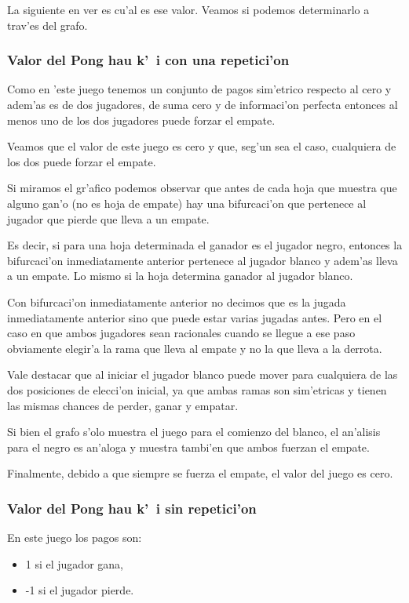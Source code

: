 La siguiente en ver es cu'al es ese valor. Veamos si podemos determinarlo a trav'es del grafo.

\subsubsection{Valor del Pong hau k'\ i con una repetici'on}

Como en 'este juego tenemos un conjunto de pagos sim'etrico respecto al cero y adem'as es de dos jugadores, de suma cero y de informaci'on perfecta entonces al menos uno de los dos jugadores puede forzar el empate.

Veamos que el valor de este juego es cero y que, seg'un sea el caso, cualquiera de los dos puede forzar el empate.

Si miramos el gr'afico podemos observar que antes de cada hoja que muestra que alguno gan'o (no es hoja de empate) hay una bifurcaci'on que pertenece al jugador que pierde que lleva a un empate.

Es decir, si para una hoja determinada el ganador es el jugador negro, entonces la bifurcaci'on inmediatamente anterior pertenece al jugador blanco y adem'as lleva a un empate. Lo mismo si la hoja determina ganador al jugador blanco.

Con bifurcaci'on inmediatamente anterior no decimos que es la jugada inmediatamente anterior sino que puede estar varias jugadas antes. Pero en el caso en que ambos jugadores sean racionales cuando se llegue a ese paso obviamente elegir'a la rama que lleva al empate y no la que lleva a la derrota.

Vale destacar que al iniciar el jugador blanco puede mover para cualquiera de las dos posiciones de elecci'on inicial, ya que ambas ramas son sim'etricas y tienen las mismas chances de perder, ganar y empatar.

Si bien el grafo s'olo muestra el juego para el comienzo del blanco, el an'alisis para el negro es an'aloga y muestra tambi'en que ambos fuerzan el empate.

Finalmente, debido a que siempre se fuerza el empate, el valor del juego es cero.

\subsubsection{Valor del Pong hau k'\ i sin repetici'on}

En este juego los pagos son:
\begin{itemize}
\item 1 si el jugador gana,
\item -1 si el jugador pierde.
\end{itemize}

